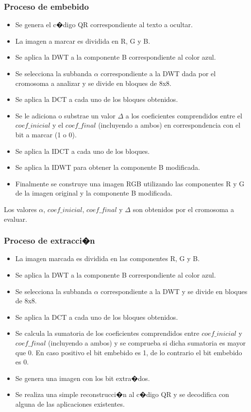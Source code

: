 \documentclass{rcci} %
\begin{document}
\subsubsection*{Proceso de embebido}
\begin{itemize}
 \item Se genera el c�digo QR correspondiente al texto a ocultar.
 \item La imagen a marcar es dividida en R, G y B.
 \item Se aplica la DWT a la componente B correspondiente al color azul.
 \item Se selecciona la subbanda $\alpha$ correspondiente a la DWT dada por el cromosoma a analizar y se divide en bloques de 8x8.
 \item Se aplica la DCT a cada uno de los bloques obtenidos.
 \item Se le adiciona o substrae un valor $\Delta$ a los coeficientes comprendidos entre el
 $coef\_inicial$ y el $coef\_final$ (incluyendo a ambos) en correspondencia con el bit a marcar (1 o 0).
 \item Se aplica la IDCT a cada uno de los bloques.
 \item Se aplica la IDWT para obtener la componente B modificada.
 \item Finalmente se construye una imagen RGB utilizando las componentes R y G de la imagen original y la componente B modificada.
\end{itemize}

Los valores $\alpha$, $coef\_inicial$, $coef\_final$ y $\Delta$ son obtenidos por el cromosoma a evaluar.

\subsubsection*{Proceso de extracci�n}
\begin{itemize}
 \item La imagen marcada es dividida en las componentes R, G y B.
 \item Se aplica la DWT a la componente B correspondiente al color azul.
 \item Se selecciona la subbanda $\alpha$ correspondiente a la DWT y se divide en bloques de 8x8.
 \item Se aplica la DCT a cada uno de los bloques obtenidos.
 \item Se calcula la sumatoria de los coeficientes comprendidos entre $coef\_inicial$ y $coef\_final$ (incluyendo a ambos)
 y se comprueba si dicha sumatoria es mayor que 0. En caso positivo el bit embebido es 1, de lo contrario
  el bit embebido es 0.
 \item Se genera una imagen con los bit extra�dos.
 \item Se realiza una simple reconstrucci�n al c�digo QR y se decodifica con alguna de las aplicaciones existentes.
\end{itemize}
\end{document}
